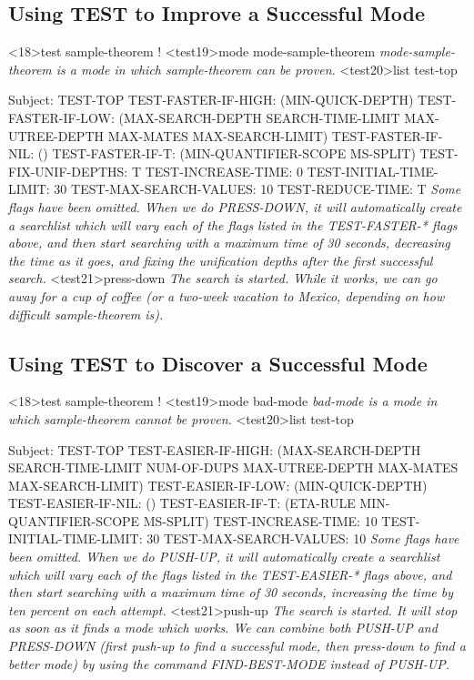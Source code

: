 \subsection{Using TEST to Improve a Successful Mode}
\begin{tpsexample}
<18>test sample-theorem !
<test19>mode mode-sample-theorem
{\it mode-sample-theorem is a mode in which sample-theorem can be proven.}
<test20>list test-top

Subject: TEST-TOP
  TEST-FASTER-IF-HIGH:   (MIN-QUICK-DEPTH)
  TEST-FASTER-IF-LOW:    (MAX-SEARCH-DEPTH SEARCH-TIME-LIMIT MAX-UTREE-DEPTH
                          MAX-MATES MAX-SEARCH-LIMIT)
  TEST-FASTER-IF-NIL:    ()
  TEST-FASTER-IF-T:      (MIN-QUANTIFIER-SCOPE MS-SPLIT)
  TEST-FIX-UNIF-DEPTHS:  T
  TEST-INCREASE-TIME:    0
  TEST-INITIAL-TIME-LIMIT: 30
  TEST-MAX-SEARCH-VALUES: 10
  TEST-REDUCE-TIME:      T
{\it Some flags have been omitted. When we do PRESS-DOWN, it will
automatically create a searchlist which will vary each
of the flags listed in the TEST-FASTER-* flags above, and then
start searching with a maximum time of 30 seconds, decreasing the
time as it goes, and fixing the unification depths after the
first successful search.}
<test21>press-down
{\it The search is started. While it works, we can go away for a
cup of coffee (or a two-week vacation to Mexico, depending on how
difficult sample-theorem is).}
\end{tpsexample}

\subsection{Using TEST to Discover a Successful Mode}
\begin{tpsexample}
<18>test sample-theorem !
<test19>mode bad-mode
{\it bad-mode is a mode in which sample-theorem cannot be proven.}
<test20>list test-top

Subject: TEST-TOP
  TEST-EASIER-IF-HIGH:   (MAX-SEARCH-DEPTH SEARCH-TIME-LIMIT NUM-OF-DUPS
                          MAX-UTREE-DEPTH MAX-MATES MAX-SEARCH-LIMIT)
  TEST-EASIER-IF-LOW:    (MIN-QUICK-DEPTH)
  TEST-EASIER-IF-NIL:    ()
  TEST-EASIER-IF-T:      (ETA-RULE MIN-QUANTIFIER-SCOPE MS-SPLIT)
  TEST-INCREASE-TIME:    10
  TEST-INITIAL-TIME-LIMIT: 30
  TEST-MAX-SEARCH-VALUES: 10
{\it Some flags have been omitted. When we do PUSH-UP, it will
automatically create a searchlist which will vary each
of the flags listed in the TEST-EASIER-* flags above, and then
start searching with a maximum time of 30 seconds, increasing the
time by ten percent on each attempt.}
<test21>push-up
{\it The search is started. It will stop as soon as it finds a mode which works.
We can combine both PUSH-UP and PRESS-DOWN (first push-up to find a successful
mode, then press-down to find a better mode) by using the command FIND-BEST-MODE
instead of PUSH-UP.}
\end{tpsexample}

